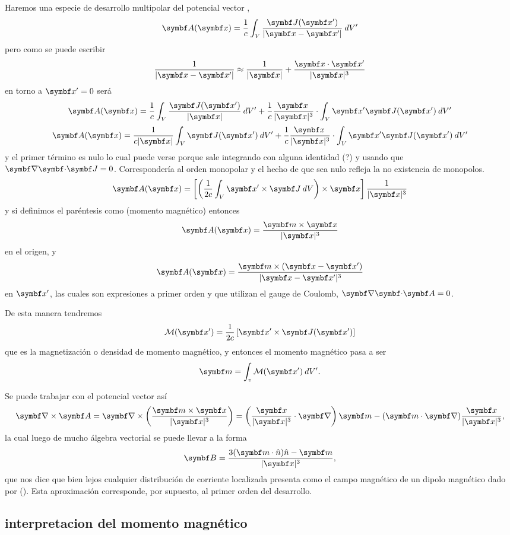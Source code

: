 \documentclass[10pt,oneside]{CBFT_book}
\begin{document}
Haremos una especie de desarrollo multipolar del potencial vector ,
\[
	\vb{A}(\vb{x}) = \frac{1}{c} \int_V \frac{\vb{J}(\vb{x}')}{|\vb{x}-\vb{x}'|} \: dV' 
\]
pero como se puede escribir
\[
	\frac{1}{|\vb{x}-\vb{x}'|} \approx \frac{1}{|\vb{x}|}  + \frac{\vb{x}\cdot\vb{x}'}{|\vb{x}|^3} 
\]
en torno a $\vb{x}'=0$ será
\[
	\vb{A}(\vb{x}) = \frac{1}{c} \int_V \frac{\vb{J}(\vb{x}')}{|\vb{x}|} \: dV' 
	+ \frac{1}{c} \frac{ \vb{x} \: }{|\vb{x}|^3} \cdot \int_V \vb{x}' \vb{J}(\vb{x}') \: dV' 
\]
\[
	\vb{A}(\vb{x}) = \frac{1}{c|\vb{x}|} \int_V \vb{J}(\vb{x}') \: dV' 
	+ \frac{1}{c} \frac{ \vb{x} \: }{|\vb{x}|^3} \cdot \int_V \vb{x}' \vb{J}(\vb{x}') \: dV' 
\]
y el primer término es nulo lo cual puede verse porque sale integrando con alguna identidad (?)
y usando que $\divem{J}=0$. Correspondería al orden monopolar y el hecho de que sea nulo refleja
la no existencia de monopolos.
\[
	\vb{A}(\vb{x}) = \left[ \left(\frac{1}{2c} \int_V \vb{x}'\times \vb{J} \: dV \right) \times \vb{x} \right] 
			\frac{1}{|\vb{x}|^3}
\]
y si definimos el paréntesis como  (momento magnético) entonces
\[
	\vb{A}(\vb{x}) = \frac{\vb{m} \times \vb{x} }{|\vb{x}|^3}
\]
en el origen, y 
\[
	\vb{A}(\vb{x}) = \frac{\vb{m} \times (\vb{x}-\vb{x}') }{|\vb{x}-\vb{x}'|^3}
\]
en $\vb{x}'$, las cuales son expresiones a primer orden y que utilizan el gauge de Coulomb, $\divem{A}=0$.

De esta manera tendremos
\[
	\mathcal{M}(\vb{x}') = \frac{1}{2c} \left[ \vb{x}' \times \vb{J}(\vb{x}')\right]
\]
que es la magnetización o densidad de momento magnético, y entonces el momento magnético pasa a ser 
\[
	\vb{m} = \int_v \mathcal{M}(\vb{x}') \:dV'.
\]

Se puede trabajar con el potencial vector así
\[
	\rotorm{A}  = \Nabla \times \left( \frac{\vb{m} \times \vb{x} }{|\vb{x}|^3} \right) =
	\left( \frac{\vb{x}}{|\vb{x}|^3}\cdot\Nabla \right)\vb{m}-(\vb{m}\cdot\Nabla)\frac{\vb{x}}{|\vb{x}|^3}, 
\]
la cual luego de mucho álgebra vectorial se puede llevar a la forma
\[
	\vb{B} = \frac{3 (\vb{m}\cdot\hat{n})\hat{n} - \vb{m}}{|\vb{x}|^3},
\]
que nos dice que bien lejos cualquier distribución de corriente localizada presenta como  el 
campo magnético de un dipolo magnético dado por (). Esta aproximación corresponde, por 
supuesto, al primer orden del desarrollo.

\subsection{interpretacion del momento magnético}
\end{document}
